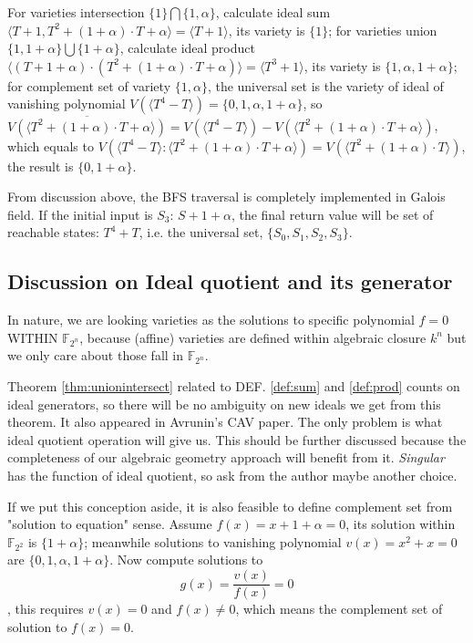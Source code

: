 \documentclass{acm_proc_article-sp}
\begin{document}
For varieties intersection $\{1\}\bigcap\{1, \alpha\}$, calculate ideal sum $\langle T+1, T^2 + (1+\alpha)\cdot T+\alpha\rangle  = \langle T+1\rangle $,
its variety is $\{1\}$; for varieties union $\{1,1+\alpha\}\bigcup\{1+\alpha\}$, calculate
ideal product $\langle (T+1+\alpha)\cdot(T^2 + (1+\alpha)\cdot T+\alpha)\rangle  = \langle T^3 + 1\rangle $, its variety
is $\{1, \alpha, 1+\alpha\}$; for complement set of variety $\{1, \alpha\}$, the universal set is
the variety of ideal of vanishing polynomial $V(\langle T^4-T\rangle ) = \{0,1,\alpha,1+\alpha\}$,
so $\overline{V(\langle T^2 + (1+\alpha)\cdot T+\alpha\rangle )} = V(\langle T^4-T\rangle ) - V(\langle T^2 + (1+\alpha)\cdot T+\alpha\rangle )$,
which equals to $V(\langle T^4-T\rangle :\langle T^2 + (1+\alpha)\cdot T+\alpha\rangle ) = V(\langle T^2+(1+\alpha)\cdot T\rangle )$,
the result is $\{0,1+\alpha\}$.

From discussion above, the BFS traversal is completely implemented in Galois field.
If the initial input is $S_3$: $S + 1 + \alpha$, the final return value will be set of
reachable states: $T^4 + T$, i.e. the universal set, $\{S_0, S_1, S_2, S_3\}$.

\subsection{Discussion on Ideal quotient and its generator}
In nature, we are looking varieties as the solutions to specific polynomial $f=0$ WITHIN $\mathbb{F}_{2^n}$, because (affine) varieties are defined
within algebraic closure $k^n$ but we only care about those fall in $\mathbb{F}_{2^n}$.

Theorem \ref{thm:unionintersect} related to DEF. \ref{def:sum} and \ref{def:prod} counts on ideal generators, so there will be no ambiguity on 
new ideals we get from this theorem. It also appeared in Avrunin's CAV paper. The only problem is what ideal quotient operation will give us.
This should be further discussed because the completeness of our algebraic geometry approach will benefit from it. \emph{Singular} has the function of
ideal quotient, so ask from the author maybe another choice.

If we put this conception aside, it is also feasible to define complement set from "solution to 
equation" sense. Assume $f(x) = x + 1 + \alpha = 0$, its solution within $\mathbb{F}_{2^2}$ 
is $\{1+\alpha\}$; meanwhile solutions to vanishing polynomial $v(x) = x^2 + x = 0$ are
$\{0,1,\alpha,1+\alpha\}$. Now compute solutions to $$g(x) = \frac{v(x)}{f(x)} = 0$$,
this requires $v(x) = 0$ and $f(x) \neq 0$, which means the complement set of solution 
to $f(x) = 0$.
\end{document}
